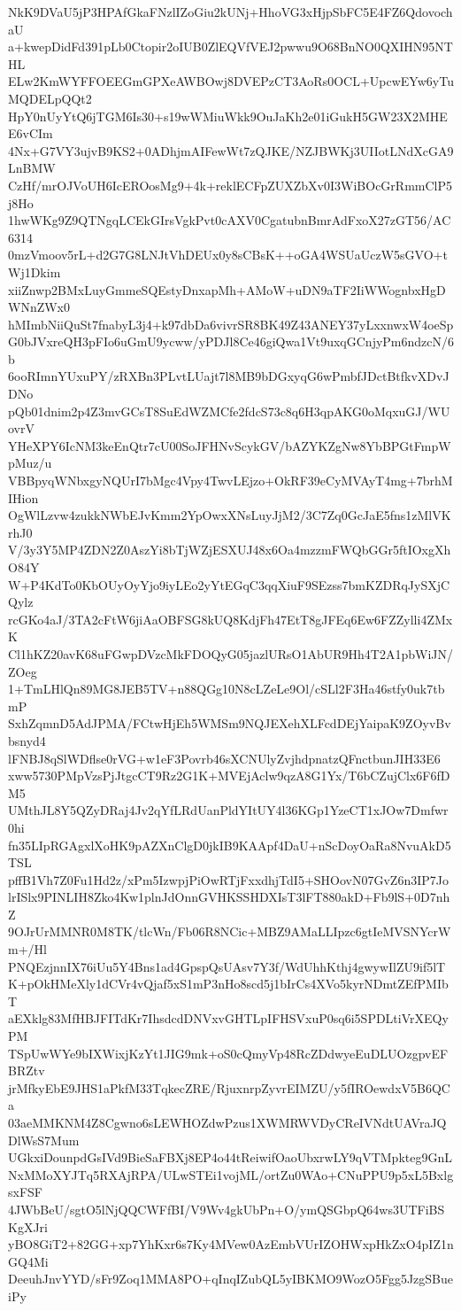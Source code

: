 NkK9DVaU5jP3HPAfGkaFNzlIZoGiu2kUNj+HhoVG3xHjpSbFC5E4FZ6QdovochaU
a+kwepDidFd391pLb0Ctopir2oIUB0ZlEQVfVEJ2pwwu9O68BnNO0QXIHN95NTHL
ELw2KmWYFFOEEGmGPXeAWBOwj8DVEPzCT3AoRs0OCL+UpcwEYw6yTuMQDELpQQt2
HpY0nUyYtQ6jTGM6Is30+s19wWMiuWkk9OuJaKh2e01iGukH5GW23X2MHEE6vCIm
4Nx+G7VY3ujvB9KS2+0ADhjmAIFewWt7zQJKE/NZJBWKj3UIIotLNdXcGA9LnBMW
CzHf/mrOJVoUH6IcEROosMg9+4k+reklECFpZUXZbXv0I3WiBOcGrRmmClP5j8Ho
1hwWKg9Z9QTNgqLCEkGIrsVgkPvt0cAXV0CgatubnBmrAdFxoX27zGT56/AC6314
0mzVmoov5rL+d2G7G8LNJtVhDEUx0y8sCBsK++oGA4WSUaUczW5sGVO+tWj1Dkim
xiiZnwp2BMxLuyGmmeSQEstyDnxapMh+AMoW+uDN9aTF2IiWWognbxHgDWNnZWx0
hMImbNiiQuSt7fnabyL3j4+k97dbDa6vivrSR8BK49Z43ANEY37yLxxnwxW4oeSp
G0bJVxreQH3pFIo6uGmU9ycww/yPDJl8Ce46giQwa1Vt9uxqGCnjyPm6ndzcN/6b
6ooRImnYUxuPY/zRXBn3PLvtLUajt7l8MB9bDGxyqG6wPmbfJDctBtfkvXDvJDNo
pQb01dnim2p4Z3mvGCsT8SuEdWZMCfe2fdcS73c8q6H3qpAKG0oMqxuGJ/WUovrV
YHeXPY6IcNM3keEnQtr7cU00SoJFHNvScykGV/bAZYKZgNw8YbBPGtFmpWpMuz/u
VBBpyqWNbxgyNQUrI7bMgc4Vpy4TwvLEjzo+OkRF39eCyMVAyT4mg+7brhMIHion
OgWlLzvw4zukkNWbEJvKmm2YpOwxXNsLuyJjM2/3C7Zq0GcJaE5fns1zMlVKrhJ0
V/3y3Y5MP4ZDN2Z0AszYi8bTjWZjESXUJ48x6Oa4mzzmFWQbGGr5ftIOxgXhO84Y
W+P4KdTo0KbOUyOyYjo9iyLEo2yYtEGqC3qqXiuF9SEzss7bmKZDRqJySXjCQylz
rcGKo4aJ/3TA2cFtW6jiAaOBFSG8kUQ8KdjFh47EtT8gJFEq6Ew6FZZylli4ZMxK
Cl1hKZ20avK68uFGwpDVzcMkFDOQyG05jazlURsO1AbUR9Hh4T2A1pbWiJN/ZOeg
1+TmLHlQn89MG8JEB5TV+n88QGg10N8cLZeLe9Ol/cSLl2F3Ha46stfy0uk7tbmP
SxhZqmnD5AdJPMA/FCtwHjEh5WMSm9NQJEXehXLFcdDEjYaipaK9ZOyvBvbsnyd4
lFNBJ8qSlWDflse0rVG+w1eF3Povrb46sXCNUlyZvjhdpnatzQFnctbunJIH33E6
xww5730PMpVzsPjJtgcCT9Rz2G1K+MVEjAclw9qzA8G1Yx/T6bCZujClx6F6fDM5
UMthJL8Y5QZyDRaj4Jv2qYfLRdUanPldYItUY4l36KGp1YzeCT1xJOw7Dmfwr0hi
fn35LIpRGAgxlXoHK9pAZXnClgD0jkIB9KAApf4DaU+nScDoyOaRa8NvuAkD5TSL
pffB1Vh7Z0Fu1Hd2z/xPm5IzwpjPiOwRTjFxxdhjTdI5+SHOovN07GvZ6n3IP7Jo
lrISlx9PINLIH8Zko4Kw1plnJdOnnGVHKSSHDXIsT3lFT880akD+Fb9lS+0D7nhZ
9OJrUrMMNR0M8TK/tlcWn/Fb06R8NCic+MBZ9AMaLLIpzc6gtIeMVSNYcrWm+/Hl
PNQEzjnnIX76iUu5Y4Bns1ad4GpspQsUAsv7Y3f/WdUhhKthj4gwywIlZU9if5lT
K+pOkHMeXly1dCVr4vQjaf5xS1mP3nHo8scd5j1bIrCs4XVo5kyrNDmtZEfPMIbT
aEXklg83MfHBJFITdKr7IhsdcdDNVxvGHTLpIFHSVxuP0sq6i5SPDLtiVrXEQyPM
TSpUwWYe9bIXWixjKzYt1JIG9mk+oS0cQmyVp48RcZDdwyeEuDLUOzgpvEFBRZtv
jrMfkyEbE9JHS1aPkfM33TqkecZRE/RjuxnrpZyvrEIMZU/y5fIROewdxV5B6QCa
03aeMMKNM4Z8Cgwno6sLEWHOZdwPzus1XWMRWVDyCReIVNdtUAVraJQDlWsS7Mum
UGkxiDounpdGsIVd9BieSaFBXj8EP4o44tReiwifOaoUbxrwLY9qVTMpkteg9GnL
NxMMoXYJTq5RXAjRPA/ULwSTEi1vojML/ortZu0WAo+CNuPPU9p5xL5BxlgsxFSF
4JWbBeU/sgtO5lNjQQCWFfBI/V9Wv4gkUbPn+O/ymQSGbpQ64ws3UTFiBSKgXJri
yBO8GiT2+82GG+xp7YhKxr6s7Ky4MVew0AzEmbVUrIZOHWxpHkZxO4pIZ1nGQ4Mi
DeeuhJnvYYD/sFr9Zoq1MMA8PO+qInqIZubQL5yIBKMO9WozO5Fgg5JzgSBueiPy
